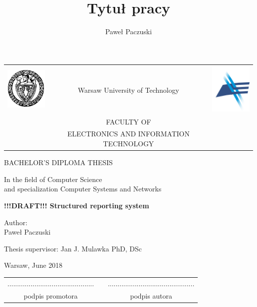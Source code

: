 \documentclass[12pt, twoside, openany]{report}
\author{Paweł Paczuski}
\title{Tytuł pracy}
\theoremstyle{definition}
\begin{document}
\begin{titlepage}
\pagestyle{empty}

\noindent
\begin{Large}
\begin{table}[t]
\centering
\begin{tabular}[t]{lcr}
 \includegraphics[width=70pt,height=70pt]{pw} & Warsaw University of Technology & \includegraphics[width=70pt,height=70pt]{elka}\\
& FACULTY OF & \\
& ELECTRONICS AND INFORMATION TECHNOLOGY &
\end{tabular}
\end{table}

\begin{center}BACHELOR'S DIPLOMA THESIS\end{center}
\begin{center}In the field of Computer Science \\ and specialization Computer Systems and Networks \end{center}\end{Large}
\begin{center}
\Huge
\textbf{!!!DRAFT!!! Structured reporting system}
\end{center}
\vfill
\begin{center}
\Large
Author:\\
\LARGE
Paweł Paczuski
\end{center}
\vfill
\begin{center}
\Large
Thesis supervisor: Jan J. Mulawka PhD, DSc
\end{center}
\vfill
\begin{center}
\Large
Warsaw, June 2018
\end{center}
\newpage
\hfill
\begin{table}[b]
\centering
\begin{tabular}[t]{ccc}
............................................. & \hspace*{100pt} & .............................................\\
podpis promotora & \hspace*{100pt} & podpis autora
\end{tabular}
\end{table}


\end{titlepage}
\end{document}
